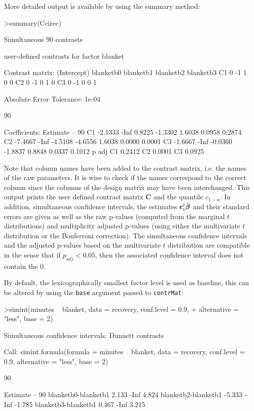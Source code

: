 \documentclass{article}
\newcommand{\bbeta}{\mbox{\boldmath $\beta$}}
\newcommand{\bc}{{\mathbf{c}}}
\newcommand{\bC}{{\mathbf{C}}}
\begin{document}
More detailed output is available by using the summary method:
\small
\begin{Schunk}
\begin{Sinput}
>summary(Ccirec)
\end{Sinput}
\begin{Soutput}
	Simultaneous 90% confidence intervals: user-defined
	contrasts

	 user-defined contrasts for factor blanket

Contrast matrix:
   (Intercept) blanketb0 blanketb1 blanketb2 blanketb3
C1           0        -1         1         0         0
C2           0        -1         0         1         0
C3           0        -1         0         0         1

Absolute Error Tolerance:  1e-04 

 90 % quantile:  1.8431 

Coefficients:
   Estimate   --    90 % t value Std.Err.  p raw p Bonf
C1  -2.1333 -Inf  0.8225 -1.3302   1.6038 0.0958 0.2874
C2  -7.4667 -Inf -4.5108 -4.6556   1.6038 0.0000 0.0001
C3  -1.6667 -Inf -0.0360 -1.8837   0.8848 0.0337 0.1012
    p adj
C1 0.2412
C2 0.0001
C3 0.0925
\end{Soutput}
\end{Schunk}
Note that column names have been added to the contrast matrix, i.e. the
names of the raw parameters. It is wise to check if the names correspond to
the correct column since the columns of the design matrix may have been
interchanged. 
\normalsize
This output prints the user defined contrast matrix $\bC$ 
and the quantile $c_{1-\alpha}$. In addition,
simultaneous confidence intervals, the estimates $\bc_i^t
\hat{\bbeta}$ and their standard errors are given as well as the raw
p-values (computed from the marginal $t$ distributions) and
multiplicity adjusted p-values (using either the multivariate $t$ distribution or
the Bonferroni correction). The simultaneous confidence intervals
and the adjusted p-values based on the multivariate $t$ distribution are compatible in
the sense that if $p_{adj}<0.05$, then the associated confidence
interval does not contain the 0.

By default, the lexicographically smallest factor level is used as baseline,
this can be altered by using the \texttt{base} argument passed to
\texttt{contrMat}:
\small
\begin{Schunk}
\begin{Sinput}
>simint(minutes ~ blanket, data = recovery, conf.level = 0.9, 
+     alternative = "less", base = 2)
\end{Sinput}
\begin{Soutput}
	Simultaneous confidence intervals: Dunnett
	contrasts

Call: 
simint.formula(formula = minutes ~ blanket, data = recovery, 
    conf.level = 0.9, alternative = "less", base = 2)

	90 % confidence intervals

                    Estimate   --   90 %
blanketb0-blanketb1    2.133 -Inf  4.824
blanketb2-blanketb1   -5.333 -Inf -1.785
blanketb3-blanketb1    0.467 -Inf  3.215
\end{Soutput}
\end{Schunk}
\normalsize
\end{document}
